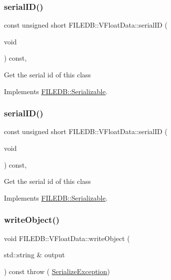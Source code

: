 \subsubsection{\texorpdfstring{serialID()}{serialID()}\hspace{0.1cm}{\footnotesize\ttfamily [1/2]}}
{\footnotesize\ttfamily const unsigned short F\+I\+L\+E\+D\+B\+::\+V\+Float\+Data\+::serial\+ID (\begin{DoxyParamCaption}\item[{void}]{ }\end{DoxyParamCaption}) const\hspace{0.3cm}{\ttfamily [inline]}, {\ttfamily [virtual]}}

Get the serial id of this class 

Implements \mbox{\hyperlink{classFILEDB_1_1Serializable_a5d639b5dbd5d8ebc7dca1eca31bbc868}{F\+I\+L\+E\+D\+B\+::\+Serializable}}.

\mbox{\label{classFILEDB_1_1VFloatData_a63b06bc5c69783fcbb4ab699b2633815}} 
\subsubsection{\texorpdfstring{serialID()}{serialID()}\hspace{0.1cm}{\footnotesize\ttfamily [2/2]}}
{\footnotesize\ttfamily const unsigned short F\+I\+L\+E\+D\+B\+::\+V\+Float\+Data\+::serial\+ID (\begin{DoxyParamCaption}\item[{void}]{ }\end{DoxyParamCaption}) const\hspace{0.3cm}{\ttfamily [inline]}, {\ttfamily [virtual]}}

Get the serial id of this class 

Implements \mbox{\hyperlink{classFILEDB_1_1Serializable_a5d639b5dbd5d8ebc7dca1eca31bbc868}{F\+I\+L\+E\+D\+B\+::\+Serializable}}.

\mbox{\label{classFILEDB_1_1VFloatData_afad9c7e520cdd7bf9ae0b477b8a5f1f1}} 
\subsubsection{\texorpdfstring{writeObject()}{writeObject()}\hspace{0.1cm}{\footnotesize\ttfamily [1/2]}}
{\footnotesize\ttfamily void F\+I\+L\+E\+D\+B\+::\+V\+Float\+Data\+::write\+Object (\begin{DoxyParamCaption}\item[{std\+::string \&}]{output }\end{DoxyParamCaption}) const throw ( \mbox{\hyperlink{classFILEDB_1_1SerializeException}{Serialize\+Exception}}) \hspace{0.3cm}{\ttfamily [virtual]}}

